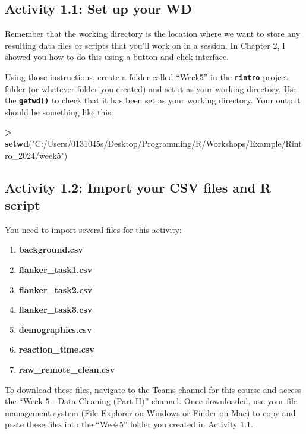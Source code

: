 \documentclass[
]{book}
\newenvironment{Shaded}{\begin{snugshade}}{\end{snugshade}}
\newcommand{\FunctionTok}[1]{\textcolor[rgb]{0.13,0.29,0.53}{\textbf{#1}}}
\newcommand{\NormalTok}[1]{#1}
\newcommand{\SpecialCharTok}[1]{\textcolor[rgb]{0.81,0.36,0.00}{\textbf{#1}}}
\newcommand{\StringTok}[1]{\textcolor[rgb]{0.31,0.60,0.02}{#1}}
\begin{document}
\subsection{Activity 1.1: Set up your WD}\label{activity-1.1-set-up-your-wd-1}

Remember that the working directory is the location where we want to store any resulting data files or scripts that you'll work on in a session. In Chapter 2, I showed you how to do this using \hyperref[set_wd]{a button-and-click interface}.

Using those instructions, create a folder called ``Week5'' in the \textbf{\texttt{rintro}} project folder (or whatever folder you created) and set it as your working directory. Use the \textbf{\texttt{getwd()}} to check that it has been set as your working directory. Your output should be something like this:

\begin{Shaded}
\begin{Highlighting}[]
\SpecialCharTok{\textgreater{}} \FunctionTok{setwd}\NormalTok{(}\StringTok{"C:/Users/0131045s/Desktop/Programming/R/Workshops/Example/Rintro\_2024/week5"}\NormalTok{)}
\end{Highlighting}
\end{Shaded}

\subsection{Activity 1.2: Import your CSV files and R script}\label{activity-1.2-import-your-csv-files-and-r-script-1}

You need to import several files for this activity:

\begin{enumerate}
\def\labelenumi{\arabic{enumi}.}
\item
  \textbf{background.csv}
\item
  \textbf{flanker\_task1.csv}
\item
  \textbf{flanker\_task2.csv}
\item
  \textbf{flanker\_task3.csv}
\item
  \textbf{demographics.csv}
\item
  \textbf{reaction\_time.csv}
\item
  \textbf{raw\_remote\_clean.csv}
\end{enumerate}

To download these files, navigate to the Teams channel for this course and access the ``Week 5 - Data Cleaning (Part II)'' channel. Once downloaded, use your file management system (File Explorer on Windows or Finder on Mac) to copy and paste these files into the ``Week5'' folder you created in Activity 1.1.
\end{document}
